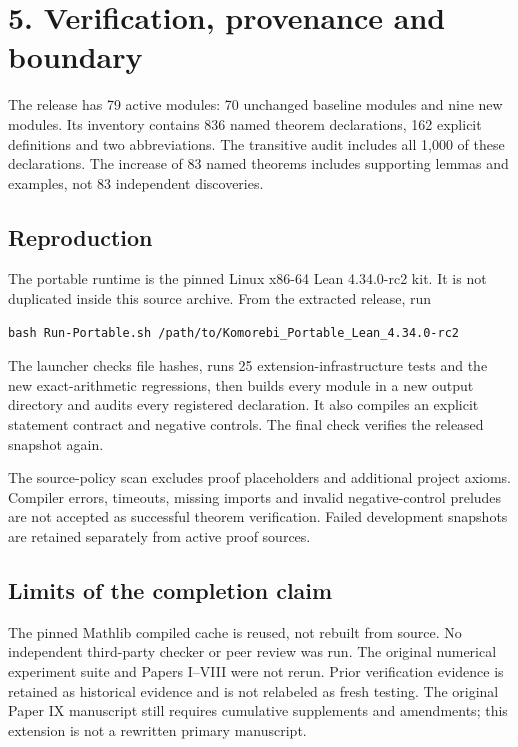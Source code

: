 \documentclass[11pt]{article}
\begin{document}
\newpage
\section*{5. Verification, provenance and boundary}
The release has 79 active modules: 70 unchanged baseline modules and nine new modules. Its inventory contains 836 named theorem declarations, 162 explicit definitions and two abbreviations. The transitive audit includes all 1,000 of these declarations. The increase of 83 named theorems includes supporting lemmas and examples, not 83 independent discoveries.



\subsection*{Reproduction}
The portable runtime is the pinned Linux x86-64 Lean 4.34.0-rc2 kit. It is not duplicated inside this source archive. From the extracted release, run
\begin{verbatim}
bash Run-Portable.sh /path/to/Komorebi_Portable_Lean_4.34.0-rc2
\end{verbatim}
The launcher checks file hashes, runs 25 extension-infrastructure tests and the new exact-arithmetic regressions, then builds every module in a new output directory and audits every registered declaration. It also compiles an explicit statement contract and negative controls. The final check verifies the released snapshot again.

The source-policy scan excludes proof placeholders and additional project axioms. Compiler errors, timeouts, missing imports and invalid negative-control preludes are not accepted as successful theorem verification. Failed development snapshots are retained separately from active proof sources.

\subsection*{Limits of the completion claim}
The pinned Mathlib compiled cache is reused, not rebuilt from source. No independent third-party checker or peer review was run. The original numerical experiment suite and Papers I--VIII were not rerun. Prior verification evidence is retained as historical evidence and is not relabeled as fresh testing. The original Paper IX manuscript still requires cumulative supplements and amendments; this extension is not a rewritten primary manuscript.
\end{document}
